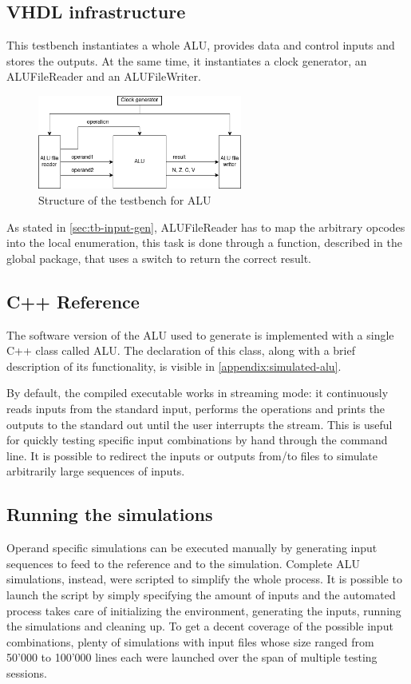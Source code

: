\subsection{VHDL infrastructure}
This testbench instantiates a whole ALU, provides data and control inputs and stores the outputs. At the same time, it
instantiates a clock generator, an ALUFileReader and an ALUFileWriter.

\begin{figure}[htbp]
    \center
	\includegraphics[width=0.6\textwidth]{./3-verification/images/tb_ALU.png}
	\caption{Structure of the testbench for ALU}
	\label{fig:tb-alu}
\end{figure}

As stated in \autoref{sec:tb-input-gen}, ALUFileReader has to map the arbitrary opcodes into the local enumeration,
this task is done through a function, described in the global package, that uses a switch to return the correct result.

\subsection{C++ Reference}
The software version of the ALU used to generate is implemented with a single C++ class called ALU. The declaration of
this class, along with a brief description of its functionality, is visible in \autoref{appendix:simulated-alu}.

By default, the compiled executable works in streaming mode: it continuously reads inputs from the standard input,
performs the operations and prints the outputs to the standard out until the user interrupts the stream. This is useful
for quickly testing specific input combinations by hand through the command line. It is possible to redirect the inputs
or outputs from/to files to simulate arbitrarily large sequences of inputs.

\subsection{Running the simulations}
Operand specific simulations can be executed manually by generating input sequences to feed to the reference and
to the simulation. Complete ALU simulations, instead, were scripted to simplify the whole process.
It is possible to launch the script by simply specifying the amount of inputs and the automated process takes care of
initializing the environment, generating the inputs, running the simulations and cleaning up. To get a decent coverage
of the possible input combinations, plenty of simulations with input files whose size ranged from 50'000 to 100'000
lines each were launched over the span of multiple testing sessions.
